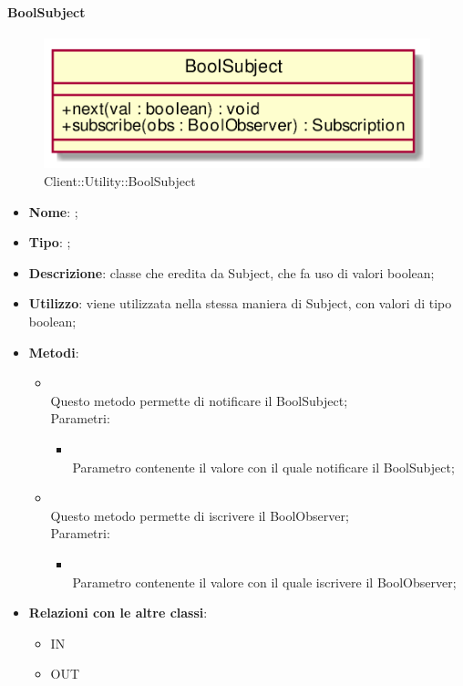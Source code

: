 \hypertarget{BoolSubject_label}{\paragraph{BoolSubject}}
\begin{figure}[h]
	\centering
	\includegraphics[width=\textwidth,height=\textheight,keepaspectratio]{images/ClassBoolSubject.png}
	\caption{Client::Utility::BoolSubject}
\end{figure}
\begin{itemize}
	\item \textbf{Nome}: ;
	\item \textbf{Tipo}: ;
	\item \textbf{Descrizione}: classe che eredita da Subject, che fa uso di valori boolean;
	\item \textbf{Utilizzo}: viene utilizzata nella stessa maniera di Subject, con valori di tipo boolean;
	\item \textbf{Metodi}:
	\begin{itemize}
		\item[]  \\
		Questo metodo permette di notificare il BoolSubject;\\
		Parametri:
		\begin{itemize}
			\item {} \\
			Parametro contenente il valore con il quale notificare il BoolSubject;
		\end{itemize}
		\item[]  \\
		Questo metodo permette di iscrivere il BoolObserver;\\
		Parametri:
		\begin{itemize}
			\item {} \\
			Parametro contenente il valore con il quale iscrivere il BoolObserver;
		\end{itemize}
	\end{itemize}
	\item \textbf{Relazioni con le altre classi}:
	\begin{itemize}
		\item IN \hyperlink{Player_label}{}
		\item OUT \hyperlink{BoolObserver_label}{}
	\end{itemize}
\end{itemize}
\FloatBarrier

